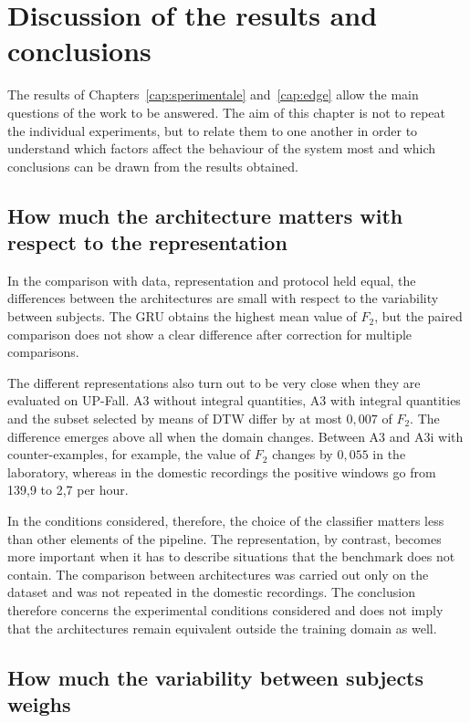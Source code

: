 \chapter{Discussion of the results and conclusions}
\label{cap:discussion}

The results of Chapters~\ref{cap:sperimentale} and~\ref{cap:edge} allow the main questions of the work to be answered. The aim of this chapter is not to repeat the individual experiments, but to relate them to one another in order to understand which factors affect the behaviour of the system most and which conclusions can be drawn from the results obtained.

\section{How much the architecture matters with respect to the representation}

In the comparison with data, representation and protocol held equal, the differences between the architectures are small with respect to the variability between subjects. The GRU obtains the highest mean value of $F_2$, but the paired comparison does not show a clear difference after correction for multiple comparisons.

The different representations also turn out to be very close when they are evaluated on UP-Fall. A3 without integral quantities, A3 with integral quantities and the subset selected by means of DTW differ by at most $0{,}007$ of $F_2$.
The difference emerges above all when the domain changes. Between A3 and A3i with counter-examples, for example, the value of $F_2$ changes by $0{,}055$ in the laboratory, whereas in the domestic recordings the positive windows go from 139,9 to 2,7 per hour.

In the conditions considered, therefore, the choice of the classifier matters less than other elements of the pipeline. The representation, by contrast, becomes more important when it has to describe situations that the benchmark does not contain. The comparison between architectures was carried out only on the dataset and was not repeated in the domestic recordings. The conclusion therefore concerns the experimental conditions considered and does not imply that the architectures remain equivalent outside the training domain as well.

\section{How much the variability between subjects weighs}

